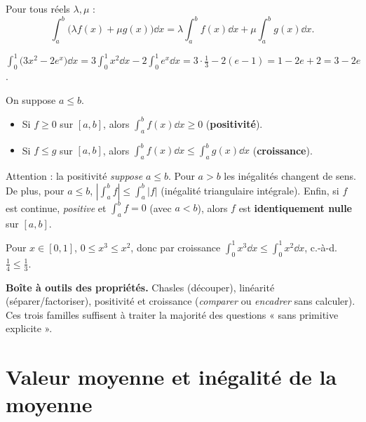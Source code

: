 \begin{theoreme}[Linéarité]
Pour tous réels $\lambda,\mu$ :
\[
\int_a^b\big(\lambda f(x)+\mu g(x)\big)\dd x=\lambda\int_a^b f(x)\dd x+\mu\int_a^b g(x)\dd x.
\]
\end{theoreme}

\begin{exemple}
$\displaystyle\int_0^1\big(3x^2-2e^x\big)\dd x=3\int_0^1 x^2\dd x-2\int_0^1 e^x\dd x
=3\cdot\frac13-2(e-1)=1-2e+2=3-2e$.
\end{exemple}

\begin{theoreme}
On suppose $a\le b$.
\begin{itemize}
\item Si $f\ge0$ sur $[a,b]$, alors $\displaystyle\int_a^b f(x)\dd x\ge0$ (\textbf{positivité}).
\item Si $f\le g$ sur $[a,b]$, alors $\displaystyle\int_a^b f(x)\dd x\le\int_a^b g(x)\dd x$ (\textbf{croissance}).
\end{itemize}
\end{theoreme}

\begin{remarque}
Attention : la positivité \emph{suppose} $a\le b$. Pour $a>b$ les inégalités changent de sens.
De plus, pour $a\le b$, $\displaystyle\left|\int_a^b f\right|\le\int_a^b|f|$ (inégalité
triangulaire intégrale). Enfin, si $f$ est continue, \emph{positive} et $\int_a^b f=0$
(avec $a<b$), alors $f$ est \textbf{identiquement nulle} sur $[a,b]$.
\end{remarque}

\begin{exemple}
Pour $x\in[0,1]$, $0\le x^3\le x^2$, donc par croissance
$\displaystyle\int_0^1 x^3\dd x\le\int_0^1 x^2\dd x$, c.-à-d. $\tfrac14\le\tfrac13$. \checkmark
\end{exemple}

\begin{aretenir}
\textbf{Boîte à outils des propriétés.} Chasles (découper), linéarité (séparer/factoriser),
positivité et croissance (\emph{comparer} ou \emph{encadrer} sans calculer). Ces trois familles
suffisent à traiter la majorité des questions « sans primitive explicite ».
\end{aretenir}

\section{Valeur moyenne et inégalité de la moyenne}

